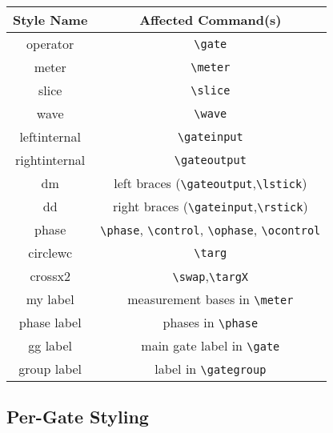 \documentclass[aps,pra,10pt,nofootinbib]{revtex4-2}
\begin{document}
\begin{center}
  \begin{tabular}{c|c}
    Style Name    & Affected Command(s)                                              \\
    \hline
    operator      & \verb!\gate!                                                     \\
    meter         & \verb!\meter!                                                    \\
    slice         & \verb!\slice!                                                    \\
    wave          & \verb!\wave!                                                     \\
    leftinternal  & \verb!\gateinput!                                                \\
    rightinternal & \verb!\gateoutput!                                               \\
    dm            & left braces (\verb!\gateoutput!,\verb!\lstick!)                  \\
    dd            & right braces (\verb!\gateinput!,\verb!\rstick!)                  \\
    phase         & \verb!\phase!, \verb!\control!, \verb!\ophase!, \verb!\ocontrol! \\
    circlewc      & \verb!\targ!                                                     \\
    crossx2       & \verb!\swap!,\verb!\targX!                                       \\
    my label      & measurement bases in \verb!\meter!                               \\
    phase label   & phases in \verb!\phase!                                          \\
    gg label      & main gate label in \verb!\gate!                                  \\
    group label   & label in \verb!\gategroup!
  \end{tabular}
\end{center}

\subsection{Per-Gate Styling}
\end{document}
